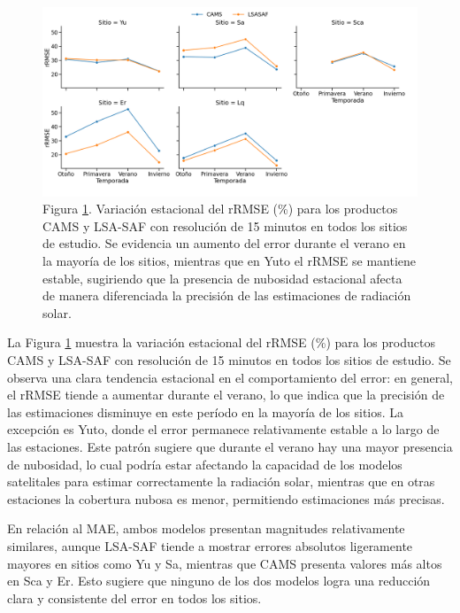 \begin{figure} 
\centering 
\includegraphics[width=\linewidth]{figuras/season_15_tesis.png}
 \caption{Figura \ref{fig:season-15}. Variación estacional del rRMSE (\%) para los productos CAMS y LSA-SAF con resolución de 15 minutos en todos los sitios de estudio. Se evidencia un aumento del error durante el verano en la mayoría de los sitios, mientras que en Yuto el rRMSE se mantiene estable, sugiriendo que la presencia de nubosidad estacional afecta de manera diferenciada la precisión de las estimaciones de radiación solar.} 
\label{fig:season-15} 
\end{figure}


La Figura \ref{fig:season-15} muestra la variación estacional del rRMSE (\%) para los productos CAMS y LSA-SAF con resolución de 15 minutos en todos los sitios de estudio. Se observa una clara tendencia estacional en el comportamiento del error: en general, el rRMSE tiende a aumentar durante el verano, lo que indica que la precisión de las estimaciones disminuye en este período en la mayoría de los sitios. La excepción es Yuto, donde el error permanece relativamente estable a lo largo de las estaciones. Este patrón sugiere que durante el verano hay una mayor presencia de nubosidad, lo cual podría estar afectando la capacidad de los modelos satelitales para estimar correctamente la radiación solar, mientras que en otras estaciones la cobertura nubosa es menor, permitiendo estimaciones más precisas.



En relación al MAE, ambos modelos presentan magnitudes relativamente similares, aunque LSA-SAF tiende a mostrar errores absolutos ligeramente mayores en sitios como Yu y Sa, mientras que CAMS presenta valores más altos en Sca y Er. Esto sugiere que ninguno de los dos modelos logra una reducción clara y consistente del error en todos los sitios.\\

